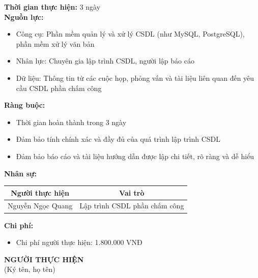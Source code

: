 {\begin{minipage}{\textwidth}
\begin{itemize}
    \end{itemize}
    \vspace{0.5cm}
    \noindent \textbf{Thời gian thực hiện:} 3 ngày \\
    \noindent \textbf{Nguồn lực:}
    \begin{itemize}
        \item Công cụ: Phần mềm quản lý và xử lý CSDL (như MySQL, PostgreSQL), phần mềm xử lý văn bản
        \item Nhân lực: Chuyên gia lập trình CSDL, người lập báo cáo
        \item Dữ liệu: Thông tin từ các cuộc họp, phỏng vấn và tài liệu liên quan đến yêu cầu CSDL phần chấm công
    \end{itemize}
    \vspace{0.5cm}
    \noindent \textbf{Ràng buộc:}
    \begin{itemize}
        \item Thời gian hoàn thành trong 3 ngày
        \item Đảm bảo tính chính xác và đầy đủ của quá trình lập trình CSDL
        \item Đảm bảo báo cáo và tài liệu hướng dẫn được lập chi tiết, rõ ràng và dễ hiểu
    \end{itemize}
    \vspace{0.5cm}
    \noindent \textbf{Nhân sự:}
    \begin{longtable}{|c|c|}
    \hline
    \textbf{Người thực hiện} & \textbf{Vai trò} \\
    \hline
    Nguyễn Ngọc Quang & Lập trình CSDL phần chấm công \\
    \hline
    \end{longtable}
    \vspace{0.5cm}
    \noindent \textbf{Chi phí:}
    \begin{itemize}
        \item Chi phí người thực hiện: 1.800.000 VNĐ
    \end{itemize}
    \vspace{1cm}
    \begin{flushleft}
        \hspace{8cm} \textbf{NGƯỜI THỰC HIỆN} \\
        \hspace{8.8cm} (Ký tên, họ tên) \\
        \vspace{1cm}
    \end{flushleft}
    \end{minipage}
}
% 
